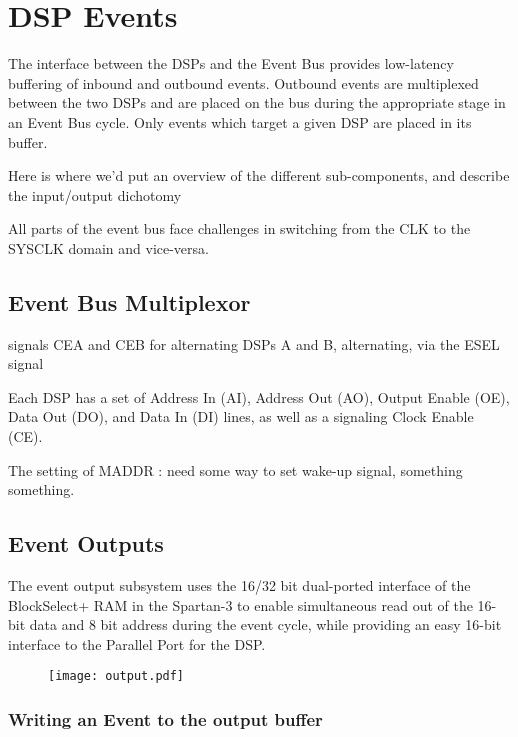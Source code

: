 \section{DSP Events}

The interface between the DSPs and the Event Bus provides low-latency
buffering of inbound and outbound events. Outbound events are
multiplexed between the two DSPs and are placed on the bus during the
appropriate stage in an Event Bus cycle. Only events which target a
given DSP are placed in its buffer.

Here is where we'd put an overview of the different sub-components,
and describe the input/output dichotomy

All parts of the event bus face challenges in switching from the CLK
to the SYSCLK domain and vice-versa.

\subsection{Event Bus Multiplexor}
      
      signals CEA and CEB for alternating DSPs A and B, alternating, via the ESEL signal
      
      Each DSP has a set of Address In (AI), Address Out (AO), Output Enable (OE), Data Out (DO), and Data In (DI) lines, as well as a signaling Clock Enable (CE). 

      The setting of MADDR : need some way to set wake-up signal, something something. 

      

\subsection{Event Outputs}

The event output subsystem uses the 16/32 bit dual-ported interface of
the BlockSelect+ RAM in the Spartan-3 to enable simultaneous read out
of the 16-bit data and 8 bit address during the event cycle, while
providing an easy 16-bit interface to the Parallel Port for the DSP.
\begin{figure}[h!]
\texttt{[image: output.pdf]}
\end{figure}



\subsubsection{Writing an Event to the output buffer}


